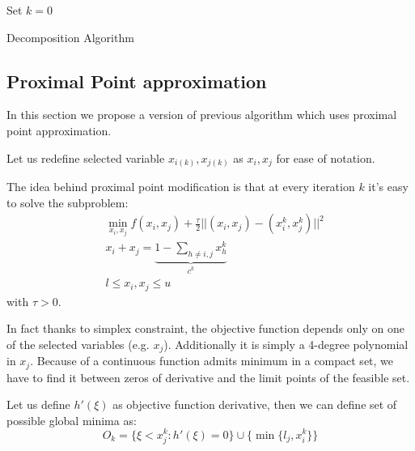 \begin{algorithm}[ht]
 Set $k = 0$\\
 \caption{Decomposition Algorithm}
\end{algorithm}
\subsection{Proximal Point approximation}
In this section we propose a version of previous algorithm which uses proximal point approximation.

Let us redefine selected variable $x_{i(k)},x_{j(k)}$ as $x_{i},x_{j}$ for ease of notation.

The idea behind proximal point modification is that at every iteration $k$ it's easy to solve the subproblem:
\begin{align}
 &\min_{x_i,x_j} f(x_i,x_j)+ \frac{\tau}{2} ||(x_i,x_j)-(x_i^k,x_j^k)||^2\\
 &x_i+x_j = \underbrace{1-\sum_{h \ne i,j} x^k_h}_{c^k}\\
 &l \le x_i,x_j\le u
 \end{align}
with $\tau>0$.

In fact thanks to simplex constraint, the objective function depends only on one of the selected variables (e.g. $x_j$). 
Additionally it is simply a 4-degree polynomial in $x_j$.
Because of a continuous function admits minimum in a compact set, we have to find it between zeros of derivative and the limit points of the feasible set.

Let us define $h'(\xi)$ as objective function derivative, then we can define set of possible global minima as:
\begin{equation}
 O_k = \{ \xi < x_j^k: h'(\xi)=0\} \cup \{\min\{l_j,x_i^k\} \}
\end{equation}

